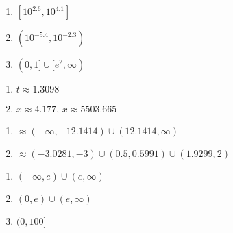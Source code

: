 \documentclass{ximera}
\begin{document}
\begin{enumerate}
\setcounter{enumi}{\value{HW}}

\item $\left[10^{2.6}, 10^{4.1}\right]$

\item $\left(10^{-5.4}, 10^{-2.3}\right)$
\item $(0, 1] \cup [e^{2}, \infty)$

\setcounter{HW}{\value{enumi}}
\end{enumerate}

\begin{enumerate}
\setcounter{enumi}{\value{HW}}

\item $t \approx 1.3098$
\item $x \approx 4.177, \, x \approx 5503.665$

\setcounter{HW}{\value{enumi}}
\end{enumerate}

\begin{enumerate}
\setcounter{enumi}{\value{HW}}

\item $\approx (-\infty, -12.1414) \cup (12.1414, \infty)$
\item $\approx (-3.0281, -3) \cup (0.5, 0.5991) \cup (1.9299, 2)$

\setcounter{HW}{\value{enumi}}
\end{enumerate}

\begin{enumerate}
\setcounter{enumi}{\value{HW}}

\item  $(-\infty, e) \cup (e, \infty)$

\item   $(0,e) \cup (e, \infty)$

\item  $(0, 100]$

\setcounter{HW}{\value{enumi}}
\end{enumerate}
\end{document}
